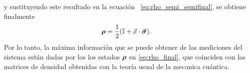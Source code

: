 \documentclass[../Main.tex]{subfiles}
\begin{document}
y sustituyendo este resultado en la ecuación ~\eqref{eq:rho_semi_semifinal}, se obtiene finalmente
\begin{equation}
\bm{\rho} = \frac{1}{2}\qty(\mathbb{I} + \vec{x}\cdot \vec{\bm{\sigma}}).
\label{eq:rho_final}
\end{equation}
Por lo tanto,  la máxima información que se puede obtener de las mediciones del sistema están dadas por los los estados $\bm{\rho}$ en \eqref{eq:rho_final}, que coinciden con las matrices de densidad obtenidas con la teoría usual de la mecanica cuántica.
\end{document}
